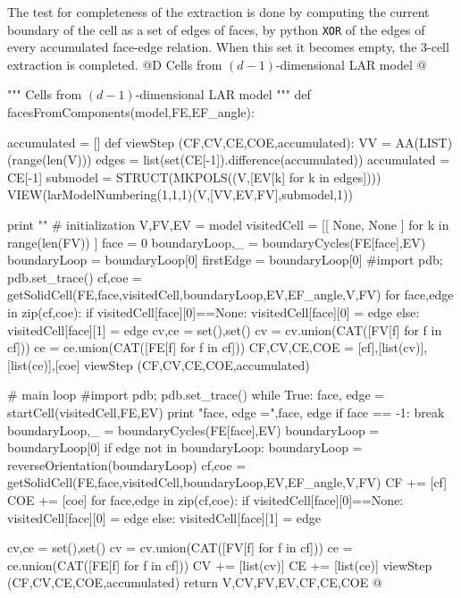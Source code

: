\documentclass[11pt,oneside]{article}    %
\begin{document}
The test for completeness of the extraction is done by computing the current boundary of the cell as a set of edges of faces, by python \texttt{XOR} of the edges of every accumulated face-edge relation. When this set it becomes empty, the 3-cell extraction is completed.
@D Cells from $(d-1)$-dimensional LAR model
@{""" Cells from $(d-1)$-dimensional LAR model """
def facesFromComponents(model,FE,EF_angle):

    accumulated = []
    def viewStep (CF,CV,CE,COE,accumulated):
        VV = AA(LIST)(range(len(V)))
        edges = list(set(CE[-1]).difference(accumulated))
        accumulated = CE[-1]
        submodel = STRUCT(MKPOLS((V,[EV[k] for k in edges])))
        VIEW(larModelNumbering(1,1,1)(V,[VV,EV,FV],submodel,1))

    print "\nECCOMI\n"
    # initialization
    V,FV,EV = model
    visitedCell = [[ None, None ] for k in range(len(FV)) ]
    face = 0
    boundaryLoop,_ = boundaryCycles(FE[face],EV)
    boundaryLoop = boundaryLoop[0]
    firstEdge = boundaryLoop[0]
    #import pdb; pdb.set_trace()
    cf,coe = getSolidCell(FE,face,visitedCell,boundaryLoop,EV,EF_angle,V,FV)
    for face,edge in zip(cf,coe):
        if visitedCell[face][0]==None: visitedCell[face][0] = edge
        else: visitedCell[face][1] = edge
    cv,ce = set(),set()
    cv = cv.union(CAT([FV[f] for f in cf]))
    ce = ce.union(CAT([FE[f] for f in cf]))
    CF,CV,CE,COE = [cf],[list(cv)],[list(ce)],[coe]
    viewStep (CF,CV,CE,COE,accumulated)
    
    # main loop
    #import pdb; pdb.set_trace()
    while True:
        face, edge = startCell(visitedCell,FE,EV)
        print "face, edge =",face, edge
        if face == -1: break
        boundaryLoop,_ = boundaryCycles(FE[face],EV)
        boundaryLoop = boundaryLoop[0]
        if edge not in boundaryLoop:
            boundaryLoop = reverseOrientation(boundaryLoop)
        cf,coe = getSolidCell(FE,face,visitedCell,boundaryLoop,EV,EF_angle,V,FV)
        CF += [cf]
        COE += [coe]
        for face,edge in zip(cf,coe):
            if visitedCell[face][0]==None: visitedCell[face][0] = edge
            else: visitedCell[face][1] = edge
            
        cv,ce = set(),set()
        cv = cv.union(CAT([FV[f] for f in cf]))
        ce = ce.union(CAT([FE[f] for f in cf]))
        CV += [list(cv)]
        CE += [list(ce)]
        viewStep (CF,CV,CE,COE,accumulated)
    return V,CV,FV,EV,CF,CE,COE
@}
    
\end{document}

